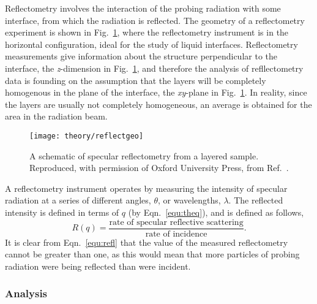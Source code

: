Reflectometry involves the interaction of the probing radiation with some interface, from which the radiation is reflected.
The geometry of a reflectometry experiment is shown in Fig.~\ref{fig:refgeo}, where the reflectometry instrument is in the horizontal configuration, ideal for the study of liquid interfaces.
Reflectometry measurements give information about the structure perpendicular to the interface, the \emph{z}-dimension in Fig.~\ref{fig:refgeo}, and therefore the analysis of refllectometry data is founding on the assumption that the layers will be completely homogenous in the plane of the interface, the \emph{xy}-plane in Fig.~\ref{fig:refgeo}.
In reality, since the layers are usually not completely homogeneous, an average is obtained for the area in the radiation beam.
%
\begin{figure}
	\centering
	\texttt{[image: theory/reflectgeo]}
	\caption{A schematic of specular reflectometry from a layered sample. Reproduced, with permission of Oxford University Press\textsuperscript{\textcopyright}, from Ref.~\cite{Sivia2011}.}
	\label{fig:refgeo}
\end{figure}
%
A reflectometry instrument operates by measuring the intensity of specular radiation at a series of different angles, $\theta$, or wavelengths, $\lambda$.
The reflected intensity is defined in terms of $q$ (by Eqn.~\ref{equ:theq}), and is defined as follows,
%
\begin{equation}
	R(q) = \frac{\text{rate of specular reflective scattering}}{\text{rate of incidence}}.
	\label{equ:refl}
\end{equation}
%
It is clear from Eqn.~\ref{equ:refl} that the value of the measured reflectometry cannot be greater than one, as this would mean that more particles of probing radiation were being reflected than were incident.

\subsubsection{Analysis}

